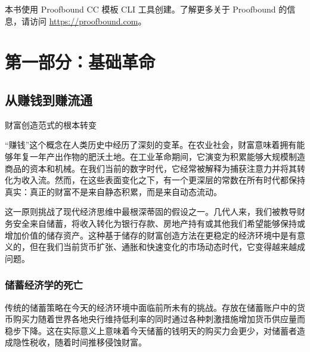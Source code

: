 \documentclass[
  Letterpaper,
]{scrbook}
\begin{document}
\begin{tcolorbox}[enhanced jigsaw, title=\textcolor{quarto-callout-note-color}{\faInfo}\hspace{0.5em}{关于本书}, opacityback=0, leftrule=.75mm, titlerule=0mm, toptitle=1mm, colframe=quarto-callout-note-color-frame, arc=.35mm, bottomtitle=1mm, rightrule=.15mm, colbacktitle=quarto-callout-note-color!10!white, colback=white, coltitle=black, breakable, toprule=.15mm, left=2mm, opacitybacktitle=0.6, bottomrule=.15mm]

本书使用 Proofbound CC 模板 CLI 工具创建。了解更多关于 Proofbound
的信息，请访问 \url{https://proofbound.com}。

\end{tcolorbox}

\part{第一部分：基础革命}

\chapter{从赚钱到赚流通}\label{sec-earning-circulation}

财富创造范式的根本转变

``赚钱''这个概念在人类历史中经历了深刻的变革。在农业社会，财富意味着拥有能够年复一年产出作物的肥沃土地。在工业革命期间，它演变为积累能够大规模制造商品的资本和机械。在我们当前的数字时代，它经常被解释为捕获注意力并将其转化为收入流。然而，在这些表面变化之下，有一个更深层的常数在所有时代都保持真实：真正的财富不是来自静态积累，而是来自动态流动。

这一原则挑战了现代经济思维中最根深蒂固的假设之一。几代人来，我们被教导财务安全来自储蓄，将收入转化为银行存款、房地产持有或其他我们希望能够保持或增加价值的储存资产。这种基于储存的财富创造方法在更稳定的经济环境中是有意义的，但在我们当前货币扩张、通胀和快速变化的市场动态时代，它变得越来越成问题。

\section{储蓄经济学的死亡}\label{ux50a8ux84c4ux7ecfux6d4eux5b66ux7684ux6b7bux4ea1}

传统的储蓄策略在今天的经济环境中面临前所未有的挑战。存放在储蓄账户中的货币购买力随着世界各地央行维持低利率的同时通过各种刺激措施增加货币供应量而稳步下降。这在实际意义上意味着今天储蓄的钱明天的购买力会更少，对储蓄者造成隐性税收，随着时间推移侵蚀财富。
\end{document}
